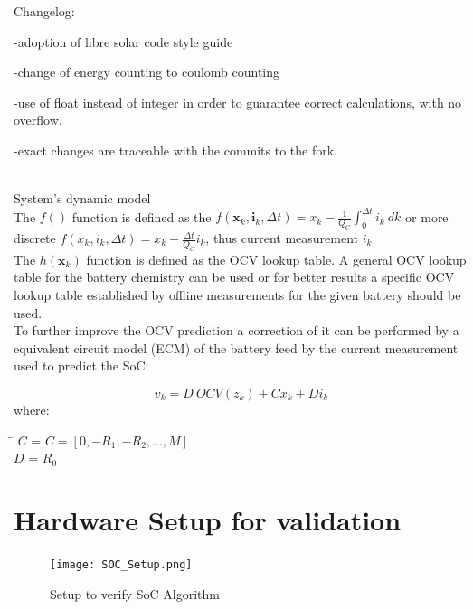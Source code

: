 Changelog: 



-adoption of libre solar code style guide 

-change of energy counting to coulomb counting

-use of float instead of integer in order to guarantee correct calculations, with no overflow. 

-exact changes are traceable with the commits to the fork. 
\\
\
\
\


{System's dynamic model} \\

The $f() $ function is defined as the $ f({\boldsymbol {x}}_{k},{\boldsymbol {i}}_{k},\Delta{t}) = {x}_{k} - \frac{1}{{Q_{C}}}\int_{0}^{\Delta t} {i_{k}\ dk} $ or more discrete $f({x}_{k},{i}_{k},\Delta{t}) = {x}_{k} - \frac{\Delta t}{Q_{C}} i_{k} $, thus current measurement $ {i}_{k} $ \\

The $h({\boldsymbol {x}}_{{k}})$ function is defined as the OCV lookup table. A general OCV lookup table for the battery chemistry can be used or for better results a specific OCV lookup table established by offline measurements for the given battery should be used. \\
To further improve the OCV prediction a correction of it can be performed by a equivalent circuit model (ECM) of the battery feed by the current measurement used to predict the SoC: 

\begin{equation}
{v}_{k} = {D} \ {OCV}({z}_{k}) + C {x}_{k}  +  D {i}_{k}  
\end{equation}
where:
\begin{tabbing}
\phantom{$v(t)  \  $}\= \kill
$C$\> =   $C= [0, -R_1, -R_2, ..., M] $ \\
$D$\> = $R_0 $    \\
\end{tabbing}


\section{Hardware Setup for validation}

\begin{figure}[!ht]
\texttt{[image: SOC\_Setup.png]}
\caption{\label{fig:SoCSetup} Setup to verify SoC Algorithm}
\end{figure}



